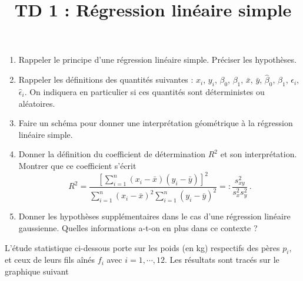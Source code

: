 \documentclass{td_um}
\title{TD 1 : Régression linéaire simple}
\providecommand{\1}{\mathds{1}}
\begin{document}
	\maketitle
	
	
	\begin{enumerate}
		\item Rappeler le principe d'une régression linéaire simple. Préciser les hypothèses.
		\item Rappeler les définitions des quantités suivantes : $x_i$, $y_i$, $\beta_0$, $\beta_1$, $\bar x$, $\bar y$, $\hat \beta_0$, $\hat \beta_1$, $\epsilon_i$, $\hat \epsilon_i$. On indiquera en particulier si ces quantités sont déterministes ou aléatoires.
		\item Faire un schéma pour donner une interprétation géométrique à la régression linéaire simple.
		\item Donner la définition du coefficient de détermination $R^2$ et son interprétation. Montrer que ce coefficient s'écrit
		\[
		R^2 = \dfrac{[\sum_{i=1}^n (x_i - \bar x)(y_i - \bar y)]^2}{\sum_{i=1}^n (x_i - \bar x)^2 \sum_{i=1}^n(y_i - \bar y)^2} =: \dfrac{s_{x y}^2}{s_{x}^2 s_{y}^2}\,.
		\]
		\item Donner les hypothèses supplémentaires dans le cas d'une régression linéaire gaussienne. Quelles informations a-t-on en plus dans ce contexte ?
	\end{enumerate}
	
	\exo{}
	L'étude statistique ci-dessous porte sur les poids (en kg) respectifs des pères $p_{i},$ et ceux de leurs fils aînés $f_{i}$ avec $i=1,\cdots,12$. Les résultats sont tracés sur le graphique suivant
	
	\begin{center}
	\end{center}
	
\end{document}
